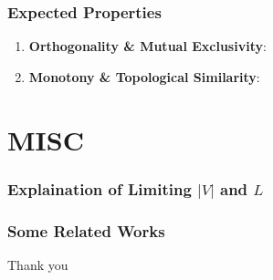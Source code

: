 \documentclass[compress,mathserif,xcolor=dvipsnames,svgnames,aspectratio=43]{beamer}
\begin{document}
\begin{frame}[c]
  \frametitle{Expected Properties}
  \begin{enumerate}
    \item \textbf{Orthogonality \& Mutual Exclusivity}: 
    \item \textbf{Monotony \& Topological Similarity}: 
  \end{enumerate}
\end{frame}


\section{MISC}

\begin{frame}[c]
  \frametitle{Explaination of Limiting $|V|$ and $L$}
  
\end{frame}

\begin{frame}[c]
  \frametitle{Some Related Works}
  \cite{li2019ease}
\end{frame}


\appendix
{}
\setcounter{finalframe}{\value{framenumber}}

\begin{frame} %

\begin{center}
\huge{Thank you}
\end{center}
\end{frame}

\begin{frame}
\tiny{
   
   
}
\end{frame}

\setcounter{framenumber}{\value{finalframe}}
\end{document}
